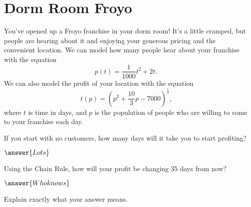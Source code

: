 \documentclass{ximera}
\begin{document}
\section{Dorm Room Froyo}
You've opened up a Froyo franchise in your dorm room! It's a little cramped, but people are hearing about it and enjoying your generous pricing and the convenient location. We can model how many people hear about your franchise with the equation $$p(t) = \frac{1}{1000}t^2 + 2t \text{.}$$ We can also model the profit of your location with the equation $$t(p) = (p^2 + \frac{10}{3}p - 7000)^{\frac{1}{4}} \text{,}$$ where $t$ is time in days, and $p$ is the population of people who are willing to come to your franchise each day.
\begin{question}
If you start with no customers, how many days will it take you to start profiting?

$\answer{Lots}$

Using the Chain Rule, how will your profit be changing 35 days from now?

$\answer{Who knows}$

Explain exactly what your answer means.
\begin{freeResponse}
\end{freeResponse}
\end{question}
\end{document}
